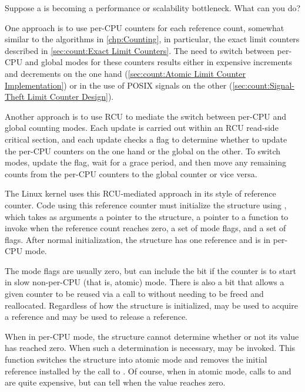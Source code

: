 Suppose a  is becoming a performance or scalability
bottleneck.
What can you do?

One approach is to use per-CPU counters for each reference count,
somewhat similar to the algorithms in \cref{chp:Counting}, in particular,
the exact limit counters described in
\cref{sec:count:Exact Limit Counters}.
The need to switch between per-CPU and global modes for these counters
results either in expensive increments and decrements on the one hand
(\cref{sec:count:Atomic Limit Counter Implementation})
or in the use of POSIX signals on the other
(\cref{sec:count:Signal-Theft Limit Counter Design}).

Another approach is to use RCU to mediate the switch between per-CPU
and global counting modes.
Each update is carried out within an RCU read-side critical section,
and each update checks a flag to determine whether to update the
per-CPU counters on the one hand or the global on the other.
To switch modes, update the flag, wait for a grace period, and then
move any remaining counts from the per-CPU counters to the global
counter or vice versa.

The Linux kernel uses this RCU-mediated approach in its 
style of reference counter.
Code using this reference counter must initialize the 
structure using , which takes as arguments
a pointer to the structure, a pointer to a function to invoke when
the reference count reaches zero, a set of mode flags, and a set
of   flags.
After normal initialization, the structure has one reference and
is in per-CPU mode.

The mode flags are usually zero, but can include the
 bit if the counter is to start in slow
non-per-CPU (that is, atomic) mode.
There is also a  bit that allows
a given  counter to be reused via a call to
 without needing to be freed and reallocated.
Regardless of how the  structure is initialized,
 may be used to acquire a reference and
 may be used to release a reference.

When in per-CPU mode, the  structure cannot determine whether
or not its value has reached zero.
When such a determination is necessary,  may
be invoked.
This function switches the structure into atomic mode and removes the
initial reference installed by the call to .
Of course, when in atomic mode, calls to  and
 are quite expensive, but 
can tell when the value reaches zero.

